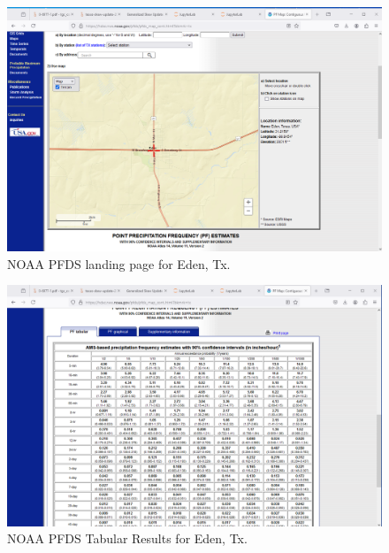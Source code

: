 \documentclass[12pt]{article}
\begin{document}
\begin{enumerate}
\begin{figure}[h!] %
   \centering
   \includegraphics[width=6in]{EdenPFDSLocate.png} 
   \caption{NOAA PFDS landing page for Eden, Tx.}
   \label{fig:EdenPFDSLocate}
\end{figure}

\begin{figure}[h!] %
   \centering
   \includegraphics[width=6in]{EdenPFDSTabular.png} 
   \caption{NOAA PFDS Tabular Results for Eden, Tx.}
   \label{fig:EdenPFDSTabular}
\end{figure}


\end{enumerate}
\end{document}
